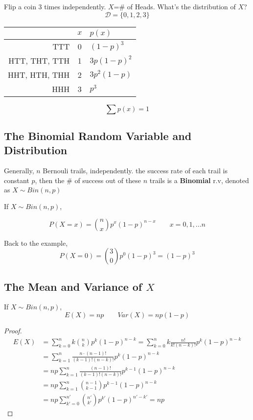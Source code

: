 \begin{exmp}
Flip a coin 3 times independently. 
$X$=\# of Heads. What's the distribution of $X$?
\[\mathcal{D}=\{0,1,2,3\}\]
\begin{center}
\begin{tabular}{r|c|l}
\hline
       &  $x$  & $p(x)$ \\
    \hline
    TTT & 0 & $(1-p)^3$ \\
    HTT, THT, TTH  & 1 & $3p(1-p)^2$ \\
    HHT, HTH, THH  & 2 & $3p^2 (1-p)$ \\
    HHH & 3 & $p^3$ \\
\hline
\end{tabular}
\[\sum p(x)=1\] 
\end{center}
\end{exmp}

\subsection{The Binomial Random Variable and Distribution}
Generally, $n$ Bernouli trails, independently. the success rate of each trail is constant $p$, then the \# of success out of these $n$ trails is a \textbf{Binomial} r.v, denoted as $X \sim Bin(n,p)$

If $X \sim Bin(n,p)$,

\[P(X=x)=\binom nx p^x (1-p)^{n-x}  \qquad x=0,1,\dots n\]

Back to the example, \[P(X=0)=\binom 30 p^0 (1-p)^3=(1-p)^3\]

\subsection{The Mean and Variance of $X$}
\begin{prop}
If $X \sim Bin(n,p)$,
\[E(X)=np \qquad Var(X)=np(1-p)\]
\begin{proof}
\begin{align*}
E(X)&=\sum_{k=0}^{n} k\binom nk p^k (1-p)^{n-k} =\sum_{k=0}^{n} k \frac{n!}{k!(n-k)!} p^k (1-p)^{n-k}\\
&=\sum_{k=1}^{n}  \frac{n \cdot(n-1)!}{(k-1)!(n-k)!} p^k (1-p)^{n-k} \\
&=np \sum_{k=1}^{n}  \frac{(n-1)!}{(k-1)!(n-k)!} p^{k-1} (1-p)^{n-k} \\
&=np \sum_{k=1}^{n}  \binom {n-1}{k-1} p^{k-1} (1-p)^{n-k}		\\
&=np \sum_{k'=0}^{n'}  \binom {n'}{k'} p^{k'} (1-p)^{n'-k'}=np
\end{align*}
\end{proof}
\end{prop}

